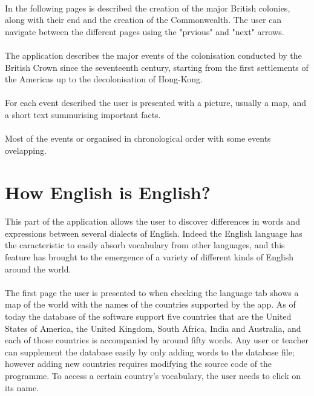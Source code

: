 \documentclass[11pt, a4paper]{report}
\begin{document}
\paragraph{}In the following pages is described the creation of the major British colonies, along with their end and the creation of the Commonwealth. The user can navigate between the different pages using the "prvious" and "next" arrows.

\paragraph{}The application describes the major events of the colonisation conducted by the British Crown since the seventeenth century, starting from the first settlements of the Americas up to the decolonisation of Hong-Kong.

\paragraph{}For each event described the user is presented with a picture, usually a map, and a short text summurising important facts.

\paragraph{}Most of the events or organised in chronological order with some events ovelapping.



\section*{How English is English?}
\paragraph{}This part of the application allows the user to discover differences in words and expressions between several dialects of English. Indeed the English language has the caracteristic to easily absorb vocabulary from other languages, and this feature has brought to the emergence of a variety of different kinds of English around the world.

\paragraph{}The first page the user is presented to when checking the language tab shows a map of the world with the names of the countries supported by the app. As of today the database of the software support five countries that are the United States of America, the United Kingdom, South Africa, India and Australia, and each of those countries is accompanied by around fifty words. Any user or teacher can supplement the database easily by only adding words to the database file; however adding new countries requires modifying the source code of the programme. To access a certain country's vocabulary, the user needs to click on its name.
\end{document}
